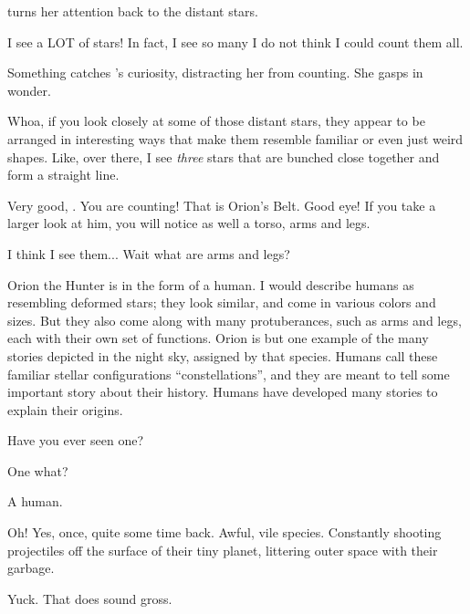 \documentclass[main.tex]{subfiles}
\begin{document}
\par \nar \rmmaia turns her attention back to the distant stars.  

\par \Maia I see a LOT of stars!  In fact, I see so many I do not think I could count them all.

\par \nar Something catches \rmmaia's curiosity, distracting her from counting.  She gasps in wonder.

\par \Maia Whoa, if you look closely at some of those distant stars, they appear to be arranged in interesting ways that make them resemble familiar or even just weird shapes.  Like, over there, I see \textit{three} stars that are bunched close together and form a straight line.

\par \Pleione Very good, \rmmaia.  You are counting!  That is Orion's Belt.  Good eye!  If you take a larger look at him, you will notice as well a torso, arms and legs.  

\par \Maia I think I see them... Wait what are arms and legs?  

\par \Pleione Orion the Hunter is in the form of a human.  I would describe humans as resembling deformed stars; they look similar, and come in various colors and sizes.  But they also come along with many protuberances, such as arms and legs, each with their own set of functions.   Orion is but one example of the many stories depicted in the night sky, assigned by that species.  Humans call these familiar stellar configurations ``constellations'', and they are meant to tell some important story about their history.  Humans have developed many stories to explain their origins.

\par \Maia Have you ever seen one?

\par \Pleione One what?

\par \Maia A human.

\par \Pleione Oh!  Yes, once, quite some time back.  Awful, vile species.  Constantly shooting projectiles off the surface of their tiny planet, littering outer space with their garbage.

\par \Maia Yuck.  That does sound gross.  
\end{document}
